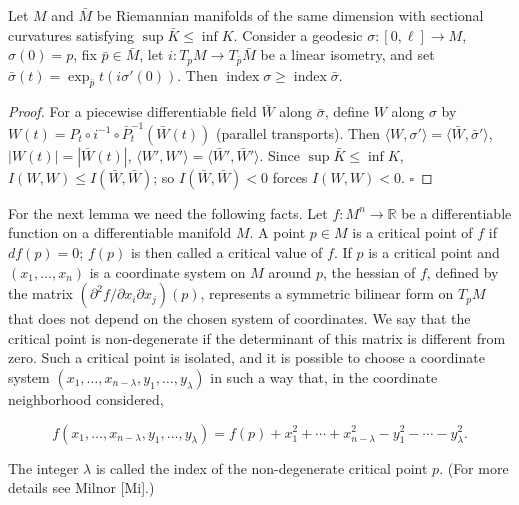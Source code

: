 \begin{lemma}
  \label{lem:dc-ch13-3-2}
  Let $M$ and $\bar M$ be Riemannian manifolds of the same dimension with sectional
  curvatures satisfying $\sup\bar K\leq\inf K$. Consider a geodesic
  $\sigma:[0,\ell]\to M$, $\sigma(0)=p$, fix $\bar p\in\bar M$, let
  $i:T_pM\to T_{\bar p}\bar M$ be a linear isometry, and set
  $\bar\sigma(t)=\exp_{\bar p}t(i\sigma'(0))$. Then
  $\operatorname{index}\sigma\geq\operatorname{index}\bar\sigma$.
\end{lemma}
\begin{proof}
  For a piecewise differentiable field $\bar W$ along $\bar\sigma$, define
  $W$ along $\sigma$ by $W(t)=P_t\circ i^{-1}\circ\bar P_t^{-1}(\bar W(t))$ (parallel
  transports). Then $\langle W,\sigma'\rangle=\langle\bar W,\bar\sigma'\rangle$,
  $|W(t)|=|\bar W(t)|$, $\langle W',W'\rangle=\langle\bar W',\bar W'\rangle$. Since
  $\sup\bar K\leq\inf K$, $I(W,W)\leq I(\bar W,\bar W)$; so $I(\bar W,\bar W)<0$ forces
  $I(W,W)<0$. $\square$
\end{proof}

For the next lemma we need the following facts. Let $f:M^n\to\mathbb{R}$ be a
differentiable function on a differentiable manifold $M$. A point $p\in M$ is a
critical point of $f$ if $df(p)=0$; $f(p)$ is then called a critical value of $f$.
If $p$ is a critical point and $(x_1,\dots,x_n)$ is a coordinate system on $M$
around $p$, the hessian of $f$, defined by the matrix
$(\partial^2f/\partial x_i\partial x_j)(p)$, represents a symmetric bilinear form
on $T_pM$ that does not depend on the chosen system of coordinates. We say that
the critical point is non-degenerate if the determinant of this matrix is
different from zero. Such a critical point is isolated, and it is possible to
choose a coordinate system $(x_1,\dots,x_{n-\lambda},y_1,\dots,y_\lambda)$ in such
a way that, in the coordinate neighborhood considered,

$$
f(x_1,\dots,x_{n-\lambda},y_1,\dots,y_\lambda)
=f(p)+x_1^2+\cdots+x_{n-\lambda}^2-y_1^2-\cdots-y_\lambda^2.
$$

The integer $\lambda$ is called the index of the non-degenerate critical point
$p$. (For more details see Milnor [Mi].)

